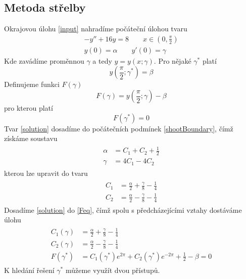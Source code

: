 \documentclass[a4paper]{article}
\begin{document}
\subsection*{Metoda střelby}
Okrajovou úlohu \eqref{input} nahradíme počáteční úlohou tvaru
\begin{subequations}\label{shoot}
	\begin{align}
		-y'' + 16y = 8 \qquad x \in \left( 0, \frac{\pi}{2} \right) \\
		y \left( 0 \right) = \alpha \qquad y' \left( 0 \right) = \gamma \label{shootBoundary}
	\end{align}
\end{subequations}
Kde zavádíme proměnnou \( \gamma \) a tedy \( y = y \left( x; \gamma \right) \). Pro nějaké \( \gamma^* \) platí
\begin{equation}
	y \left( \frac{\pi}{2}; \gamma^* \right) = \beta
\end{equation}
Definujeme funkci \( F \left( \gamma \right) \)
\begin{equation}
	F \left( \gamma \right) = y \left( \frac{\pi}{2}; \gamma \right) - \beta
\end{equation}
pro kterou platí 
\begin{equation}\label{Feq}
	F \left( \gamma^* \right) = 0
\end{equation}
Tvar \eqref{solution} dosadíme do počátečních podmínek \eqref{shootBoundary}, čímž získáme soustavu
\begin{align}
	\begin{split}
		\alpha &= C_1 + C_2 + \frac{1}{2} \\
		\gamma &= 4C_1 - 4C_2
	\end{split}
\end{align}
kterou lze upravit do tvaru
\begin{align}
	\begin{split}
		C_1 &= \frac{\alpha}{2} + \frac{\gamma}{8} - \frac{1}{4} \\
		C_2 &= \frac{\alpha}{2} - \frac{\gamma}{8} - \frac{1}{4}
	\end{split}
\end{align}
Dosadíme \eqref{solution} do \eqref{Feq}, čímž spolu s předcházejícími vztahy dostáváme úlohu
\begin{align}
	\begin{split}
		C_1 \left( \gamma \right) &= \frac{\alpha}{2} + \frac{\gamma}{8} - \frac{1}{4} \\
		C_2 \left( \gamma \right) &= \frac{\alpha}{2} - \frac{\gamma}{8} - \frac{1}{4} \\
		F \left( \gamma^* \right) &= C_1 \left( \gamma^* \right) e^{ 2 \pi } + C_2 \left( \gamma^* \right) e^{-2 \pi} + \frac{1}{2} - \beta = 0
	\end{split}
\end{align}
K hledání řešení \( \gamma^* \) můžeme využít dvou přístupů.
\end{document}
